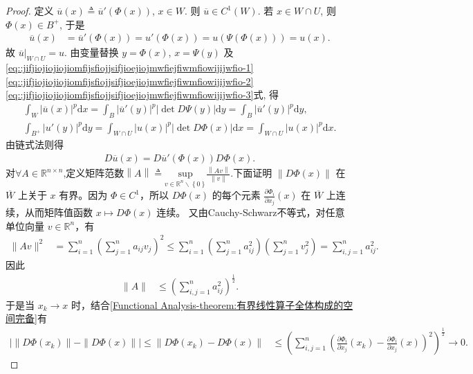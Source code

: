 \documentclass[../../main.tex]{subfiles}
\begin{document}
\begin{proof}
定义 \(\overline{u}(x) \triangleq \overline{u}'(\Phi(x))\), \(x \in W\). 则 \(\overline{u} \in C^1(W)\). 若 \(x \in W \cap U\), 则 \(\Phi(x) \in B^+\), 于是
\begin{align*}
\overline{u}(x) &= \overline{u}'(\Phi(x)) = u'(\Phi(x)) = u(\Psi(\Phi(x))) = u(x).
\end{align*}
故 \(\overline{u}|_{W \cap U} = u\). 由变量替换 \(y = \Phi(x)\), \(x = \Psi(y)\) 及\eqref{eq::jifjiojiojiojiomfijsfiojjsifjioejiojmwfiejfiwmfiowijijwfio-1}\eqref{eq::jifjiojiojiojiomfijsfiojjsifjioejiojmwfiejfiwmfiowijijwfio-2}\eqref{eq::jifjiojiojiojiomfijsfiojjsifjioejiojmwfiejfiwmfiowijijwfio-3}式, 得
\begin{gather}
\int_W |\overline{u}(x)|^p \mathrm{d}x = \int_B |\overline{u}'(y)|^p |\det D\Psi(y)| \mathrm{d}y = \int_B |\overline{u}'(y)|^p \mathrm{d}y,\label{eq::jijioqwio93283r3r23}\\
\int_{B^+} |u'(y)|^p \mathrm{d}y = \int_{W \cap U} |u(x)|^p |\det D\Phi(x)| \mathrm{d}x = \int_{W \cap U} |u(x)|^p \mathrm{d}x.\label{eq::jijioqwio93283r3r23-111}
\end{gather}
由链式法则得
\begin{align}
D\overline{u}(x) = D\overline{u}'(\Phi(x)) D\Phi(x). \label{eq:ch05-chain-rule-uv}
\end{align}
对$\forall A\in \mathbb{R}^{n\times n}$,定义矩阵范数$\left\| A \right\| \triangleq \underset{v\in \mathbb{R} ^n\backslash \left\{ 0 \right\}}{\mathrm{sup}}\frac{\left\| Av \right\|}{\left\| v \right\|}$.下面证明 \(\|D\Phi(x)\|\) 在 \(\overline{W}\) 上关于 \(x\) 有界。因为 \(\Phi \in C^1\)，所以 \(D\Phi(x)\) 的每个元素 \(\frac{\partial \Phi_i}{\partial x_j}(x)\) 在 \(\overline{W}\) 上连续，从而矩阵值函数 \(x \mapsto D\Phi(x)\) 连续。
又由Cauchy-Schwarz不等式，对任意单位向量 \(v \in \mathbb{R}^n\)，有
\begin{align*}
\|Av\|^2 &= \sum_{i=1}^n \left( \sum_{j=1}^n a_{ij} v_j \right)^2 \leqslant \sum_{i=1}^n \left( \sum_{j=1}^n a_{ij}^2 \right) \left( \sum_{j=1}^n v_j^2 \right) = \sum_{i,j=1}^n a_{ij}^2.
\end{align*}
因此
\begin{align*}
\|A\| &\leqslant \left( \sum_{i,j=1}^n a_{ij}^2 \right)^{\frac{1}{2}}.
\end{align*}
于是当 \(x_k \to x\) 时，结合\cref{Functional Analysis-theorem:有界线性算子全体构成的空间完备}有
\begin{align*}
\bigl| \|D\Phi(x_k)\| - \|D\Phi(x)\| \bigr| \leqslant \|D\Phi(x_k) - D\Phi(x)\| &\leqslant \left( \sum_{i,j=1}^n \left( \frac{\partial \Phi_i}{\partial x_j}(x_k) - \frac{\partial \Phi_i}{\partial x_j}(x) \right)^2 \right)^{\frac{1}{2}} \to 0.

\end{align*}
\end{proof}
\end{document}
